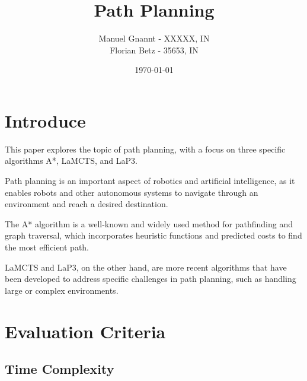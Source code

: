 \documentclass[bibliography=totoc]{scrartcl}
\title{Path Planning}
\author{Manuel Gnannt - XXXXX, IN \\ Florian Betz - 35653, IN}
\date{\today}
\begin{document}
\maketitle



\tableofcontents







\clearpage



\section{Introduce}







This paper explores the topic of path planning, with a focus on three specific algorithms A*, LaMCTS, and LaP3. 



Path planning is an important aspect of robotics and artificial intelligence, as it enables robots and other autonomous systems to navigate through an environment and reach a desired destination. 



The A* algorithm is a well-known and widely used method for pathfinding and graph traversal, which incorporates heuristic functions and predicted costs to find the most efficient path. 



LaMCTS and LaP3, on the other hand, are more recent algorithms that have been developed to address specific challenges in path planning, such as handling large or complex environments.







\section{Evaluation Criteria} \label{corner_detection}







\subsection{Time Complexity}
\end{document}
